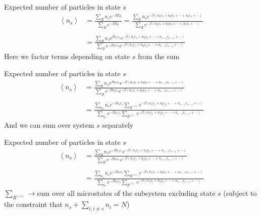 \documentclass{beamer}
\begin{document}
\begin{frame}{Expected number of particles in state $s$}
	\begin{align*}
		\left<n_s\right>&=\frac{\sum_{R}n_se^{-\beta E_R}}{\sum_{R}e^{-\beta E_R}}=\frac{\sum_{R}n_se^{-\beta\left(n_1\epsilon_1+n_2\epsilon_2+\cdots+n_s\epsilon_s+\cdots\right)}}{\sum_{R}e^{-\beta\left(n_1\epsilon_1+n_2\epsilon_2+\cdots+n_s\epsilon_s+\cdots\right)}}\\ \\
		&=\frac{\sum_{R}n_se^{\beta n_s\epsilon_s}e^{-\beta\left(n_1\epsilon_1+n_2\epsilon_2+\cdots+n_{s-1}\epsilon_{s-1}+\cdots\right)}}{\sum_{R}e^{-\beta n_s\epsilon_s}e^{-\beta\left(n_1\epsilon_1+n_2\epsilon_2+\cdots+n_{s-1}\epsilon_{s-1}+\cdots\right)}}
	\end{align*}
Here we factor terms depending on state $s$ from the sum
\end{frame}





\begin{frame}{Expected number of particles in state $s$}
	\begin{align*}
		\left<n_s\right>&=\frac{\sum_{R}n_se^{\beta n_s\epsilon_s}e^{-\beta\left(n_1\epsilon_1+n_2\epsilon_2+\cdots+n_{s-1}\epsilon_{s-1}+\cdots\right)}}{\sum_{R}e^{-\beta n_s\epsilon_s}e^{-\beta\left(n_1\epsilon_1+n_2\epsilon_2+\cdots+n_{s-1}\epsilon_{s-1}+\cdots\right)}}\\ \\
		&=\frac{\sum_{n_s}n_se^{-\beta n_s\epsilon_s}\sum_{R^{(s)}}e^{-\beta\left(n_1\epsilon_1+n_2\epsilon_2+\cdots+n_{s-1}\epsilon_{s-1}+\cdots\right)}}{\sum_{n_s}e^{-\beta n_s\epsilon_s}\sum_{R^{(s)}}e^{-\beta\left(n_1\epsilon_1+n_2\epsilon_2+\cdots+n_{s-1}\epsilon_{s-1}+\cdots\right)}}
	\end{align*}
	And we can sum over system $s$ separately
\end{frame}



\begin{frame}{Expected number of particles in state $s$}
	\begin{align*}
		\left<n_s\right>&=\frac{\sum_{R}n_se^{-\beta n_s\epsilon_s}e^{-\beta\left(n_1\epsilon_1+n_2\epsilon_2+\cdots+n_{s-1}\epsilon_{s-1}+\cdots\right)}}{\sum_{R}e^{-\beta n_s\epsilon_s}e^{-\beta\left(n_1\epsilon_1+n_2\epsilon_2+\cdots+n_{s-1}\epsilon_{s-1}+\cdots\right)}}\\ \\
		&=\frac{\sum_{n_s}n_se^{-\beta n_s\epsilon_s}\sum_{R^{(s)}}e^{-\beta\left(n_1\epsilon_1+n_2\epsilon_2+\cdots+n_{s-1}\epsilon_{s-1}+\cdots\right)}}{\sum_{n_s}e^{-\beta n_s\epsilon_s}\sum_{R^{(s)}}e^{-\beta\left(n_1\epsilon_1+n_2\epsilon_2+\cdots+n_{s-1}\epsilon_{s-1}+\cdots\right)}}
	\end{align*}
$\sum_{R^{(s)}}\rightarrow$sum over all microstates of the subsystem excluding state $s$ (subject to the constraint that $n_s+\sum_{i,i\neq s}n_i=N$)
\end{frame}
\end{document}
